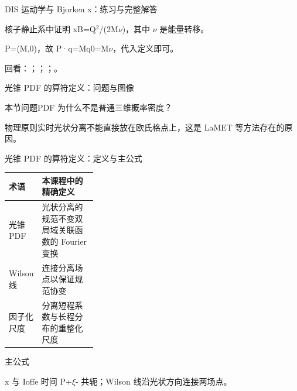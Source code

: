 \begin{frame}[t]{DIS 运动学与 Bjorken x：练习与完整解答}
\footnotesize
\begin{block}{}核子静止系中证明 xB=Q\ensuremath{^{2}}/\allowbreak{}(2M\ensuremath{\nu})，其中 \ensuremath{\nu} 是能量转移。\end{block}
\begin{exampleblock}{}P=(M,0)，故 P·q=Mq0=M\ensuremath{\nu}，代入定义即可。\end{exampleblock}
\vfill
\scriptsize 回看：；；；。
\end{frame}

\begin{frame}[t]{光锥 PDF 的算符定义：问题与图像}
\footnotesize
\begin{block}{本节问题}PDF 为什么不是普通三维概率密度？\end{block}
\begin{block}{物理原则}\quad 实时光状分离不能直接放在欧氏格点上，这是 LaMET 等方法存在的原因。\end{block}
\end{frame}

\begin{frame}[t]{光锥 PDF 的算符定义：定义与主公式}
\footnotesize\begin{tabularx}{\linewidth}{p{0.30\linewidth}Y}
\toprule 术语 & 本课程中的精确定义\\\midrule
{} 光锥 PDF & 光状分离的规范不变双局域关联函数的 Fourier 变换\\
 Wilson 线 & 连接分离场点以保证规范协变\\
 因子化尺度 & 分离短程系数与长程分布的重整化尺度\\
\bottomrule\end{tabularx}\vspace{0.15cm}
\begin{block}{ 主公式}\centering{}\end{block}
x 与 Ioffe 时间 P+\ensuremath{\xi}- 共轭；Wilson 线沿光状方向连接两场点。
\end{frame}

